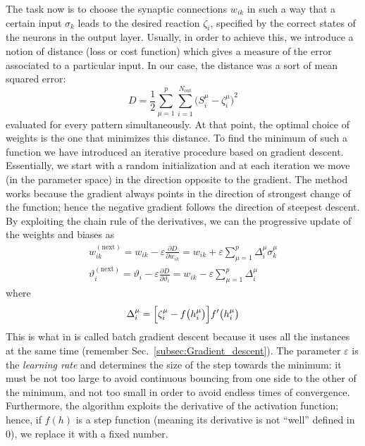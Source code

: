 The task now is to choose the synaptic connections $w_{ik}$ in such a way that a certain input $\sigma_k$ leads to the desired reaction $\zeta_i$, specified by the correct states of the neurons in the output layer. Usually, in order to achieve this, we introduce a notion of distance (loss or cost function) which gives a measure of the error associated to a particular input. In our case, the distance was a sort of mean squared error:
\begin{equation}
D=\frac{1}{2}\sum_{\mu=1}^p\sum_{i=1}^{N_{\text{out}}}{\bigl(S_i^\mu-\zeta_i^\mu\bigr)}^2
\end{equation}
evaluated for every pattern simultaneously. At that point, the optimal choice of weights is the one that minimizes this distance. To find the minimum of such a function we have introduced an iterative procedure based on gradient descent. Essentially, we start with a random initialization and at each iteration we move (in the parameter space) in the direction opposite to the gradient. The method works because the gradient always points in the direction of strongest change of the function; hence the negative gradient follows the direction of steepest descent. By exploiting the chain rule of the derivatives, we can the progressive update of the weights and biases as
\begin{gather}
w_{ik}^{(\text{next})}=w_{ik}-\varepsilon\frac{\partial D}{\partial w_{ik}}=w_{ik}+\varepsilon\sum_{\mu=1}^p\Delta_i^\mu\sigma_k^\mu\\
\vartheta_{i}^{(\text{next})}=\vartheta_i-\varepsilon\frac{\partial D}{\partial\vartheta_i}=w_{ik}-\varepsilon\sum_{\mu=1}^p\Delta_i^\mu
\end{gather}
where
\begin{equation}
\Delta_i^\mu=\Bigl[\zeta_i^\mu-f\bigl(h_i^\mu\bigr)\Bigr]f'\bigl(h_i^\mu\bigr)
\end{equation}
This is what in \cite{Geron2} is called batch gradient descent because it uses all the instances at the same time (remember Sec.~\ref{subsec:Gradient_descent}).
The parameter $\varepsilon$ is the \emph{learning rate} and determines the size of the step towards the minimum: it must be not too large to avoid continuous bouncing from one side to the other of the minimum, and not too small in order to avoid endless times of convergence. Furthermore, the algorithm exploits the derivative of the activation function; hence, if $f(h)$ is a step function (meaning its derivative is not ``well'' defined in 0), we replace it with a fixed number.

